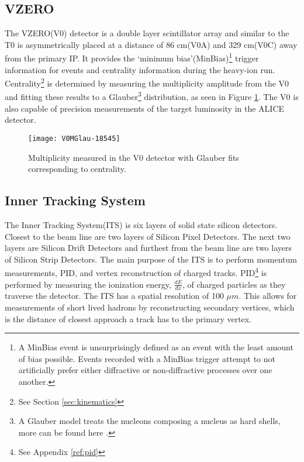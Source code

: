 \subsection{VZERO}
The VZERO(V0)\cite{Abbas:2013taa} detector is a double layer scintillator array and similar to the T0 is asymmetrically placed at a distance of 86 cm(V0A) and 329 cm(V0C) away from the primary IP.  It provides the `minimum bias'(MinBias)\footnote{A MinBias event is unsurprisingly defined as an event with the least amount of bias possible.  Events recorded with a MinBias trigger  attempt to not artificially prefer either diffractive or non-diffractive processes over one another\cite{Field:2011iq}.} trigger information for events and centrality information during the heavy-ion run.   Centrality\footnote{See Section \ref{sec:kinematics}} is determined by measuring the multiplicity amplitude from the V0 and fitting these results to a Glauber\footnote{A Glauber model treats the nucleons composing a nucleus as hard shells, more can be found here \cite{Loizides:2016djv}.} distribution, as seen in Figure \ref{fig:ITSGLAUBERFIT}.  The V0 is also capable of precision measurements of the target luminosity in the ALICE detector.

\begin{figure}[h!]
\texttt{[image: V0MGlau-18545]}
\centering
\caption{Multiplicity measured in the V0 detector with Glauber fits corresponding to centrality\cite{Adam:2015ptt}.}
 \label{fig:ITSGLAUBERFIT}
\end{figure}

\subsection{Inner Tracking System}\label{sec:its}
The Inner Tracking System(ITS)\cite{BEOLE20121062} is six layers of solid state silicon detectors.  Closest to the beam line are two layers of Silicon Pixel Detectors.  The next two layers are Silicon Drift Detectors and furthest from the beam line are two layers of Silicon Strip Detectors.  The main purpose of the ITS is to perform momentum measurements, PID, and vertex reconstruction of charged tracks.  PID\footnote{See Appendix \ref{ref:pid}} is performed by measuring the ionization energy, $\frac{dE}{dx}$, of charged particles as they traverse the detector\cite{Adam:2016acv}.  The ITS has a spatial resolution of 100 $\mu m$.  This allows for measurements of short lived hadrons by reconstructing secondary vertices, which is the distance of closest approach a track has to the primary vertex.


